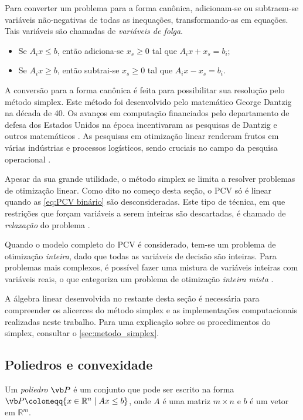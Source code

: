 Para converter um problema para a forma canônica, adicionam-se ou subtraem-se variáveis não-negativas de todas as inequações, transformando-as em equações. Tais variáveis são chamadas de \emph{variáveis de folga}.

\begin{itemize}
    \item Se $A_ix \leq b$, então adiciona-se $x_s \geq 0$ tal que $A_ix + x_s = b_i$;
    \item Se $A_ix \geq b$, então subtrai-se $x_s \geq 0$ tal que $A_ix - x_s = b_i$. 
\end{itemize}

A conversão para a forma canônica é feita para possibilitar sua resolução pelo método simplex. Este método foi desenvolvido pelo matemático George Dantzig na década de 40. Os avanços em computação financiados pelo departamento de defesa dos Estados Unidos na época incentivaram as pesquisas de Dantzig e outros matemáticos \cite{DANTZIG:90}. As pesquisas em otimização linear renderam frutos em várias indústrias e processos logísticos, sendo cruciais no campo da pesquisa operacional \cite{SOBRAPO:17}.

Apesar da sua grande utilidade, o método simplex se limita a resolver problemas de otimização linear. Como dito no começo desta seção, o PCV só é linear quando as \cref{eq:PCV binário} são desconsideradas. Este tipo de técnica, em que restrições que forçam variáveis a serem inteiras são descartadas, é chamado de \emph{relaxação} do problema \cite{BEASLEY}.

Quando o modelo completo do PCV é considerado, tem-se um problema de otimização \emph{inteira}, dado que todas as variáveis de decisão são inteiras. Para problemas mais complexos, é possível fazer uma mistura de variáveis inteiras com variáveis reais, o que categoriza um problema de otimização \emph{inteira mista} \cite{LAVROV:19,KARVE:22,BRIDGELALL:22}.

A álgebra linear desenvolvida no restante desta seção é necessária para compreender os alicerces do método simplex e as implementações computacionais realizadas neste trabalho. Para uma explicação sobre os procedimentos do simplex, consultar o \cref{sec:metodo_simplex}.

\subsection{Poliedros e convexidade}

\begin{mydef}[Poliedro] \label{def:poliedro}
Um \emph{poliedro} $\vb P$ é um conjunto que pode ser escrito na forma $\vb P \coloneqq \{x \in \mathbb{R}^n \mid Ax \leq b\}$, onde $A$ é uma matriz $m\times n$ e $b$ é um vetor em $\mathbb{R}^m$.
\end{mydef}

